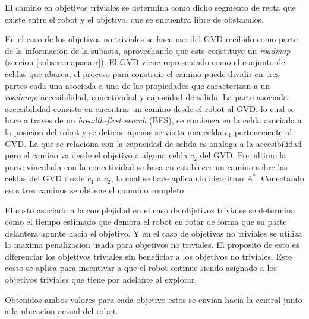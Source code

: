 El camino en objetivos triviales se determina como dicho segmento de recta que
existe entre el robot y el objetivo, que se encuentra libre de obstaculos. 

En el caso de los objetivos no triviales se hace uso del GVD recibido como
parte de la informacion de la subasta, aprovechando que este constituye un
\emph{roadmap} (seccion \ref{subsec:mapacarr}). El GVD viene representado
como el conjunto de celdas que abarca, el proceso para construir el camino puede dividir 
en tres partes cada una asociada a una de las propiedades que caracterizan a un
\emph{roadmap}: accesibilidad, conectividad y capacidad de salida. La parte asociada
accesibilidad consiste en encontrar un camino desde el robot al GVD, lo cual se
hace a traves de un \emph{breadth-first search} (BFS), se comienza en la celda
asociada a la posicion del robot y se detiene apenas se visita una celda $c_1$
perteneciente al GVD. La que se relaciona con la capacidad de salida es analoga a la
accesibilidad pero el camino va desde el objetivo a alguna celda $c_2$ del GVD.
Por ultimo la parte vinculada con la conectividad se basa en establecer un
camino sobre las celdas del GVD desde $c_1$ a $c_2$, lo cual se hace aplicando
algoritmo $A^*$. Conectando esos tres caminos se obtiene el camnino completo.

El costo asociado a la complejidad en el caso de objetivos triviales se
determina como el tiempo estimado que demora el robot en rotar de forma que su
parte delantera apunte hacia el objetivo. Y en el caso de objetivos no
triviales se utiliza la maxima penalizacion usada para objetivos no triviales.
El proposito de esto es diferenciar los objetivos triviales sin beneficiar a
los objetivos no triviales. Este costo se aplica para incentivar a que el robot
ontinue siendo asignado a los objetivos triviales que tiene por adelante al
explorar.

Obtenidos ambos valores para cada objetivo estos se envian hacia la central
junto a la ubicacion actual del robot.



